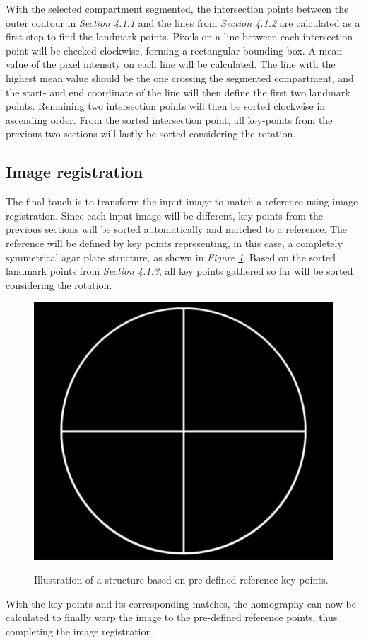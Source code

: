 \noindent With the selected compartment segmented, the intersection points between the outer contour in \textit{Section 4.1.1} and the lines from \textit{Section 4.1.2} are calculated as a first step to find the landmark points. Pixels on a line between each intersection point will be checked clockwise, forming a rectangular bounding box. A mean value of the pixel intensity on each line will be calculated. The line with the highest mean value should be the one crossing the segmented compartment, and the start- and end coordinate of the line will then define the first two landmark points. Remaining two intersection points will then be sorted clockwise in ascending order. From the sorted intersection point, all key-points from the previous two sections will lastly be sorted considering the rotation.


\subsection{Image registration}
The final touch is to transform the input image to match a reference using image registration. Since each input image will be different, key points from the previous sections will be sorted automatically and matched to a reference. The reference will be defined by key points representing, in this case, a completely symmetrical agar plate structure, as shown in \textit{Figure \ref{fig:keypoint structure}}.  Based on the sorted landmark points from \textit{Section 4.1.3}, all key points gathered so far will be sorted considering the rotation.\\

\begin{figure}[H]
    \centering
    \includegraphics[width=0.3\linewidth]{figures/PDF/Ref_structure.pdf}\\
    \caption{Illustration of a structure based on pre-defined reference key points.}
    \label{fig:keypoint structure}
\end{figure}

\noindent With the key points and its corresponding matches, the homography can now be calculated to finally warp the image to the pre-defined reference points, thus completing the image registration.\\


